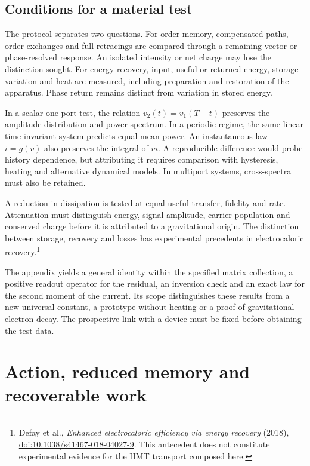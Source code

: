 \subsection{Conditions for a material test}
\label{md:aux:contraste-material}

The protocol separates two questions. For order memory, compensated
paths, order exchanges and full retracings are compared through a
remaining vector or phase-resolved response. An isolated intensity
or net charge may lose the distinction sought. For energy recovery,
input, useful or returned energy, storage variation and heat are
measured, including preparation and restoration of the apparatus.
Phase return remains distinct from variation in stored energy.

In a scalar one-port test, the relation
$v_2(t)=v_1(T-t)$ preserves the amplitude distribution and power
spectrum. In a periodic regime, the same linear time-invariant system
predicts equal mean power. An instantaneous law $i=g(v)$ also preserves
the integral of $vi$. A reproducible difference would probe history
dependence, but attributing it requires comparison with hysteresis,
heating and alternative dynamical models. In multiport systems,
cross-spectra must also be retained.

A reduction in dissipation is tested at equal useful transfer,
fidelity and rate. Attenuation must distinguish energy, signal
amplitude, carrier population and conserved charge before it is
attributed to a gravitational origin. The distinction between storage,
recovery and losses has experimental precedents in electrocaloric
recovery.\footnote{Defay et al., \emph{Enhanced electrocaloric
efficiency via energy recovery} (2018),
\href{https://doi.org/10.1038/s41467-018-04027-9}{doi:10.1038/s41467-018-04027-9}.
This antecedent does not constitute experimental evidence for the
HMT transport composed here.}

The appendix yields a general identity within the specified matrix
collection, a positive readout operator for the residual, an inversion
check and an exact law for the second moment of the current.
Its scope distinguishes these results from a new universal constant,
a prototype without heating or a proof of gravitational electron
decay. The prospective link with a device must be fixed before
obtaining the test data.

\section{Action, reduced memory and recoverable work}
\label{md:aux:trabajo}

